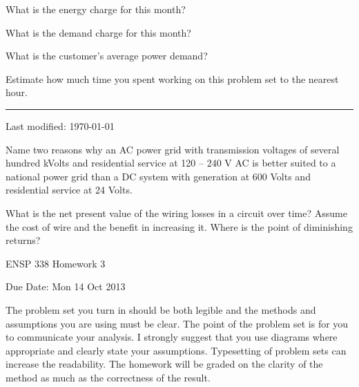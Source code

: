 \documentclass{article}
\begin{document}
\subproblem
What is the energy charge for this month?




\subproblem
What is the demand charge for this month?



\subproblem
What is the customer's average power demand?






\problem{}
Estimate how much time you spent working on this problem set to the
nearest hour.

\newpage
\setcounter{problem}{0}
\hrule
\vspace{10pt}

{\tiny Last modified: \today}

\problem{}
Name two reasons why an AC power grid with transmission voltages of several
hundred kVolts and residential service at 120 -- 240 V AC is better suited to a
national power grid than a DC system with generation at 600 Volts and
residential service at 24 Volts.

\problem{}
What is the net present value of the wiring losses in a circuit over
time?  Assume the cost of wire and the benefit in increasing it.  Where
is the point of diminishing returns?

 ENSP 338 Homework 3

Due Date:  Mon 14 Oct 2013

The problem set you turn in should be both legible and the methods and
assumptions you are using must be clear.  The point of the problem set
is for you to communicate your analysis.  I strongly suggest that you
use diagrams where appropriate and clearly state your assumptions.
Typesetting of problem sets can increase the readability.  The homework
will be graded on the clarity of the method as much as the correctness
of the result.
\end{document}
